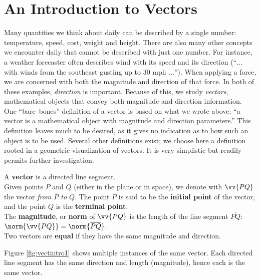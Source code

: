\section{An Introduction to Vectors}\label{sec:vector_intro}

Many quantities we think about daily can be described by a single number: temperature, speed, cost, weight and height. There are also many other concepts we encounter daily that cannot be described with just one number. For instance, a weather forecaster often describes wind with its speed and its direction (``$\ldots$ with winds from the southeast gusting up to 30 mph $\ldots$''). When applying a force, we are concerned with both the magnitude and direction of that force. In both of these examples, \textit{direction} is important. Because of this, we study \textit{vectors}, mathematical objects that convey both magnitude and direction information.\\

One ``bare--bones'' definition of a vector is based on what we wrote above: ``a vector is a mathematical object with magnitude and direction parameters.'' This definition leaves much to be desired, as it gives no indication as to how such an object is to be used. Several other definitions exist; we choose here a definition rooted in a geometric visualization of vectors. It is very simplistic but readily permits further investigation.

{A \textbf{vector} is a directed line segment.\\

Given points $P$ and $Q$ (either in the plane or in space), we denote with $\vv{PQ}$ the vector \textit{from $P$ to $Q$}. The point $P$ is said to be the \textbf{initial point} of the vector, and the point $Q$ is the \textbf{terminal point}. \\

The \textbf{magnitude}, or \textbf{norm} of $\vv{PQ}$ is the length of the line segment $\overline{PQ}$: $\norm{\vv{PQ}} = \norm{\overline{PQ}}$.\\

Two vectors are \textbf{equal} if they have the same magnitude and direction.
}

Figure \ref{fig:vectintro1} shows multiple instances of the same vector. Each directed line segment has the same direction and length (magnitude), hence each is the same vector.

